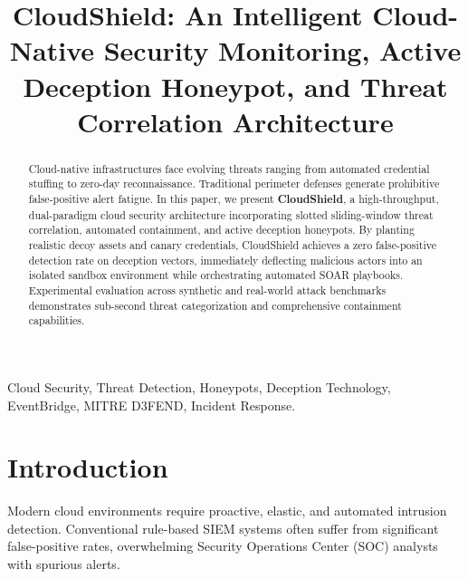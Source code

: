 \documentclass[conference]{IEEEtran}
\begin{document}
\title{CloudShield: An Intelligent Cloud-Native Security Monitoring, Active Deception Honeypot, and Threat Correlation Architecture}

\author{
}

\maketitle

\begin{abstract}
Cloud-native infrastructures face evolving threats ranging from automated credential stuffing to zero-day reconnaissance. Traditional perimeter defenses generate prohibitive false-positive alert fatigue. In this paper, we present \textbf{CloudShield}, a high-throughput, dual-paradigm cloud security architecture incorporating slotted sliding-window threat correlation, automated containment, and active deception honeypots. By planting realistic decoy assets and canary credentials, CloudShield achieves a zero false-positive detection rate on deception vectors, immediately deflecting malicious actors into an isolated sandbox environment while orchestrating automated SOAR playbooks. Experimental evaluation across synthetic and real-world attack benchmarks demonstrates sub-second threat categorization and comprehensive containment capabilities.
\end{abstract}

\begin{IEEEkeywords}
Cloud Security, Threat Detection, Honeypots, Deception Technology, EventBridge, MITRE D3FEND, Incident Response.
\end{IEEEkeywords}

\section{Introduction}
Modern cloud environments require proactive, elastic, and automated intrusion detection. Conventional rule-based SIEM systems often suffer from significant false-positive rates, overwhelming Security Operations Center (SOC) analysts with spurious alerts.
\end{document}
